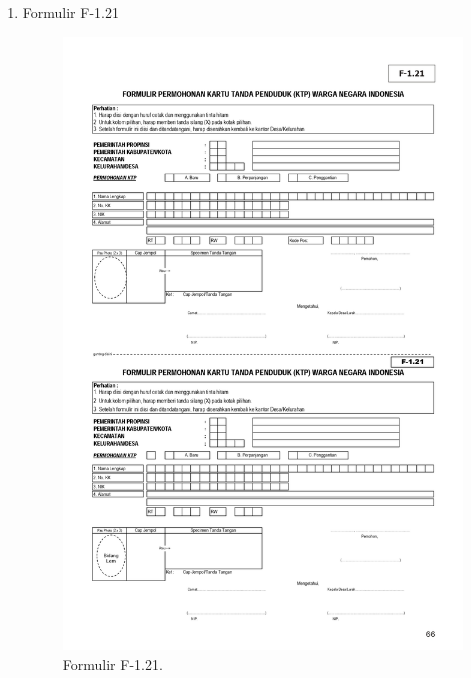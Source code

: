 \begin{enumerate}
	\item Formulir F-1.21
	\begin{figure}[H]
		\centering
		\includegraphics[width=12cm]{figures/formulir.jpg}
		\caption{Formulir F-1.21.}	
	\end{figure}


\end{enumerate}
